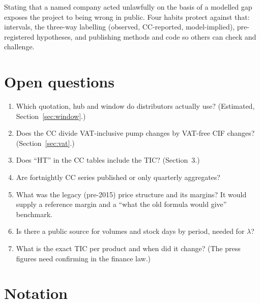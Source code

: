 \documentclass[11pt,a4paper]{article}
\theoremstyle{definition}
\begin{document}
\begin{warning}
Stating that a named company acted unlawfully on the basis of a modelled gap exposes the project to being wrong in public. Four habits protect against that: intervals, the three-way labelling (observed, CC-reported, model-implied), pre-registered hypotheses, and publishing methods and code so others can check and challenge.
\end{warning}

\section{Open questions}

\begin{enumerate}[leftmargin=2em]
\item Which quotation, hub and window do distributors actually use? (Estimated, Section~\ref{sec:window}.)
\item Does the CC divide VAT-inclusive pump changes by VAT-free CIF changes? (Section~\ref{sec:vat}.)
\item Does ``HT'' in the CC tables include the TIC? (Section~3.)
\item Are fortnightly CC series published or only quarterly aggregates?
\item What was the legacy (pre-2015) price structure and its margins? It would supply a reference margin and a ``what the old formula would give'' benchmark.
\item Is there a public source for volumes and stock days by period, needed for $\lambda$?
\item What is the exact TIC per product and when did it change? (The press figures need confirming in the finance law.)
\end{enumerate}

\appendix

\section{Notation}
\end{document}
